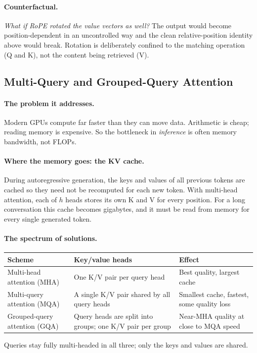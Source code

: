 \documentclass[11pt,a4paper]{article}
\begin{document}
\paragraph{Counterfactual.} \emph{What if RoPE rotated the value vectors as well?} The output
would become position-dependent in an uncontrolled way and the clean relative-position
identity above would break. Rotation is deliberately confined to the matching operation
(Q and K), not the content being retrieved (V).

\subsection{Multi-Query and Grouped-Query Attention}

\paragraph{The problem it addresses.} Modern GPUs compute far faster than they can move data.
Arithmetic is cheap; reading memory is expensive. So the bottleneck in \emph{inference} is
often memory bandwidth, not FLOPs.

\paragraph{Where the memory goes: the KV cache.} During autoregressive generation, the keys
and values of all previous tokens are cached so they need not be recomputed for each new
token. With multi-head attention, each of $h$ heads stores its own K and V for every position.
For a long conversation this cache becomes gigabytes, and it must be read from memory for
every single generated token.

\paragraph{The spectrum of solutions.}
\begin{center}
\begin{tabularx}{\textwidth}{lYY}
\textbf{Scheme} & \textbf{Key/value heads} & \textbf{Effect} \\
\hline
Multi-head attention (MHA) & One K/V pair per query head & Best quality, largest cache \\
Multi-query attention (MQA) & A single K/V pair shared by all query heads & Smallest cache,
fastest, some quality loss \\
Grouped-query attention (GQA) & Query heads are split into groups; one K/V pair per group &
Near-MHA quality at close to MQA speed \\
\end{tabularx}
\end{center}
Queries stay fully multi-headed in all three; only the keys and values are shared.
\end{document}
